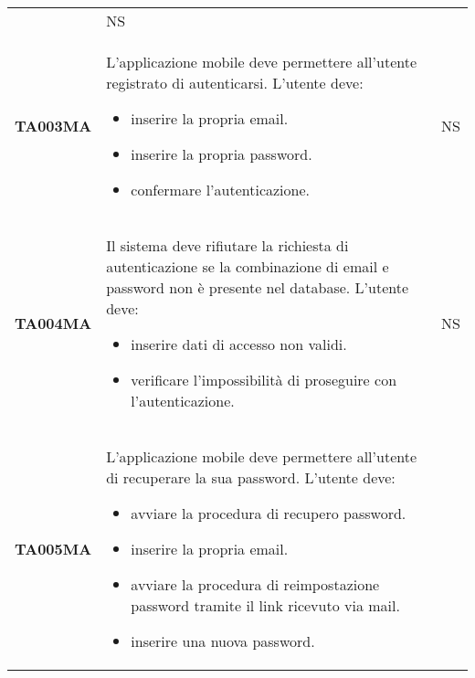 \documentclass[../piano-di-qualifica.tex]{subfiles}
\begin{document}
\begin{longtable}[H]{>{\centering\bfseries}m{3cm} >{}m{10cm} >{\centering\arraybackslash}m{3cm}}
                    & NS                                                                                                                                                                                                                                                               \\
  TA003MA           & L'applicazione mobile deve permettere all'utente registrato di autenticarsi. \newline
  L'utente deve:
  \begin{itemize}
    \item inserire la propria email.
    \item inserire la propria password.
    \item confermare l'autenticazione.
  \end{itemize}
                    & NS                                                                                                                                                                                                                                                               \\
  TA004MA           & Il sistema deve rifiutare la richiesta di autenticazione se la combinazione di email e password non è presente nel database. \newline
  L'utente deve:
  \begin{itemize}
    \item inserire dati di accesso non validi.
    \item verificare l'impossibilità di proseguire con l'autenticazione.
  \end{itemize}
                    & NS                                                                                                                                                                                                                                                               \\
  TA005MA           & L'applicazione mobile deve permettere all'utente di recuperare la sua password. \newline
  L'utente deve:
  \begin{itemize}
    \item avviare la procedura di recupero password.
    \item inserire la propria email.
    \item avviare la procedura di reimpostazione password tramite il link ricevuto via mail.
    \item inserire una nuova password.

\end{itemize}
\end{longtable}
\end{document}
